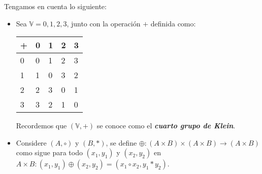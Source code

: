 \documentclass{report}
\begin{document}

    Tengamos en cuenta lo siguiente:

    \begin{itemize}
        \item Sea $\mathbb{V} = {0, 1, 2, 3}$, junto con la operación $+$ definida como:
            \begin{table}[h!]
                \centering
                \begin{tabular}{l|llll}
                + & 0 & 1 & 2 & 3 \\ \hline
                0 & 0 & 1 & 2 & 3 \\
                1 & 1 & 0 & 3 & 2 \\
                2 & 2 & 3 & 0 & 1 \\
                3 & 3 & 2 & 1 & 0
                \end{tabular}
            \end{table}

            Recordemos que $(\mathbb{V}, +)$ se conoce como el \textit{\textbf{cuarto grupo de Klein}}.
        \item Considere $(A, \circ)$ y $(B, *)$, se define $\oplus: (A\times B)\times (A\times B)\rightarrow (A\times B)$ como sigue para todo $(x_1, y_1)$ y $(x_2, y_2)$ en $A\times B: (x_1, y_1)\oplus (x_2, y_2) = (x_1 \circ x_2, y_1 * y_2)$.
    \end{itemize}
\end{document}
